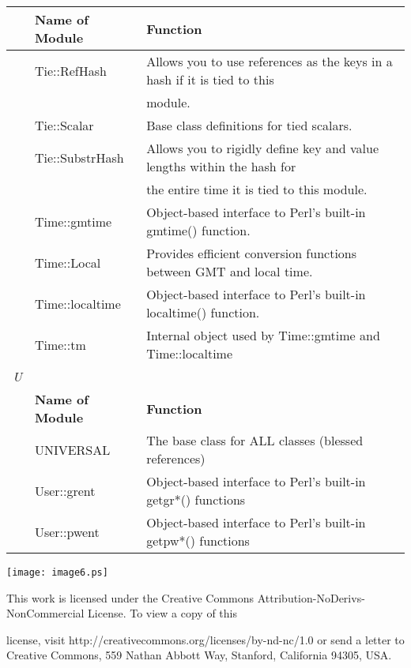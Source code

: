 \documentclass[a4paper,11pt]{book}
\begin{document}
\begin{tabular}{|p{0.3in}|p{1.0in}|p{2.9in}|} \hline 
 & \textbf{Name of Module} & \textbf{Function} \\ \hline 
 & Tie::RefHash & Allows you to use references as the keys in a hash if it is tied to this \\ \hline 
 &  & module. \\ \hline 
 & Tie::Scalar & Base class definitions for tied scalars. \\ \hline 
 & Tie::SubstrHash & Allows you to rigidly define key and value lengths within the hash for \\ \hline 
 &  & the entire time it is tied to this module. \\ \hline 
 & Time::gmtime & Object-based interface to Perl's built-in gmtime() function. \\ \hline 
 & Time::Local & Provides efficient conversion functions between GMT and local time. \\ \hline 
 & Time::localtime & Object-based interface to Perl's built-in localtime() function. \\ \hline 
 & Time::tm & Internal object used by Time::gmtime and Time::localtime \\ \hline 
\newline \textit{U} &  &  \\ \hline 
 & \textbf{Name of Module} & \textbf{Function} \\ \hline 
 & UNIVERSAL & The base class for ALL classes (blessed references) \\ \hline 
 & User::grent & Object-based interface to Perl's built-in getgr*() functions \\ \hline 
 & User::pwent & Object-based interface to Perl's built-in getpw*() functions \\ \hline 
\end{tabular}

 

\noindent  

\noindent  

\noindent  

\noindent 

\noindent \texttt{[image: image6.ps]}

\noindent 

\noindent This work is licensed under the Creative Commons Attribution-NoDerivs-NonCommercial License. To view a copy of this

\noindent license, visit http://creativecommons.org/licenses/by-nd-nc/1.0 or send a letter to Creative Commons, 559 Nathan Abbott Way, Stanford, California 94305, USA.
\end{document}
